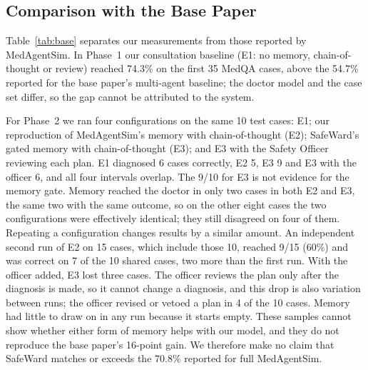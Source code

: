 \documentclass[conference]{IEEEtran}
\begin{document}
\subsection{Comparison with the Base Paper}
Table~\ref{tab:base} separates our measurements from those reported by MedAgentSim. In Phase~1 our
consultation baseline (E1: no memory, chain-of-thought or review) reached 74.3\% on the first 35 MedQA
cases, above the 54.7\% reported for the base paper's multi-agent baseline; the doctor model and the
case set differ, so the gap cannot be attributed to the system.

For Phase~2 we ran four configurations on the same 10 test cases: E1; our reproduction of
MedAgentSim's memory with chain-of-thought (E2); SafeWard's gated memory with chain-of-thought (E3);
and E3 with the Safety Officer reviewing each plan. E1 diagnosed 6 cases correctly, E2 5, E3 9 and E3
with the officer 6, and all four intervals overlap. The 9/10 for E3 is not evidence for the memory
gate. Memory reached the doctor in only two cases in both E2 and E3, the same two with the same
outcome, so on the other eight cases the two configurations were effectively identical; they still
disagreed on four of them. Repeating a configuration changes results by a similar amount. An independent
second run of E2 on 15 cases, which include those 10, reached 9/15 (60\%) and was correct on 7 of the
10 shared cases, two more than the first run. With the officer added, E3 lost three cases. The officer
reviews the plan only after the diagnosis is made, so it cannot change a diagnosis, and this drop is
also variation between runs; the officer revised or vetoed a plan in 4 of the 10 cases. Memory had little to draw on in any run because it starts empty. These samples cannot show
whether either form of memory helps with our model, and they do not reproduce the base paper's
16-point gain. We therefore make no claim that SafeWard matches or exceeds the 70.8\% reported for
full MedAgentSim.
\end{document}
